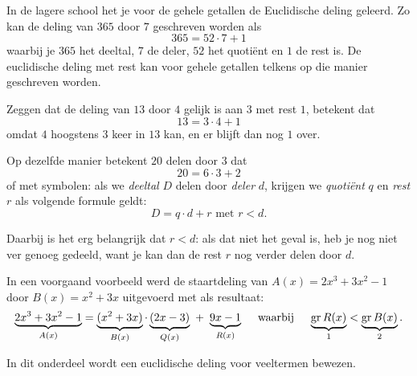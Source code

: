 \documentclass{ximera}
\begin{document}
	\author{Koen de Naeghel - Wiskunde Op Maat}
    \xmsource



In de lagere school het je voor de gehele getallen de Euclidische deling geleerd. Zo kan de deling van \(365\) door \(7\) geschreven worden als
\[
365 = 52 \cdot 7 + 1
\]
waarbij je \(365\) het deeltal, \(7\) de deler, \(52\) het quotiënt en \(1\) de rest is. De euclidische deling met rest kan voor gehele getallen telkens op die manier geschreven worden. 


\begin{example}\nl
         
	Zeggen dat de deling van \(13\) door \(4\) gelijk is aan \(3\) met rest \(1\), betekent dat
	\[
	13 = 3 \cdot 4  + 1
	\]
	omdat \(4\) hoogstens \(3\) keer in \(13\) kan, en er blijft dan nog \(1\) over.
	 
	Op dezelfde manier betekent \(20\) delen door \(3\) dat
	\[
	20 = 6\cdot 3 + 2
	\]
	of met symbolen: als we \textit{deeltal} \(D\) delen door \textit{deler} \(d\), krijgen we \textit{quotiënt} \(q\) en \textit{rest} \(r\) als volgende formule geldt:
	\[
	D = q\cdot d + r   \text{ met \(r<d\)}.
	\]
	 
	 
	Daarbij is het erg belangrijk dat \(r<d\): als dat niet het geval is, heb je nog niet ver genoeg gedeeld, want je kan dan de rest \(r\) nog verder delen door \(d\).
	 
\end{example}







In een voorgaand voorbeeld werd de staartdeling van \(A(x) = 2x^3+3x^2-1\) door \(B(x) = x^2+3x\) uitgevoerd met als resultaat: 
\[
\underbrace{2x^3+3x^2-1}_{A(x)} = \underbrace{(x^2+3x)}_{B(x)}\cdot\underbrace{(2x-3)}_{Q(x)} \,\, + \,\, \underbrace{9x-1}_{R(x)} \quad \text{ waarbij } \quad \underbrace{\operatorname{gr} R(x)}_{1} < \underbrace{\operatorname{gr} B(x)}_{2}.
\]

In dit onderdeel wordt een euclidische deling voor veeltermen bewezen.
\end{document}
